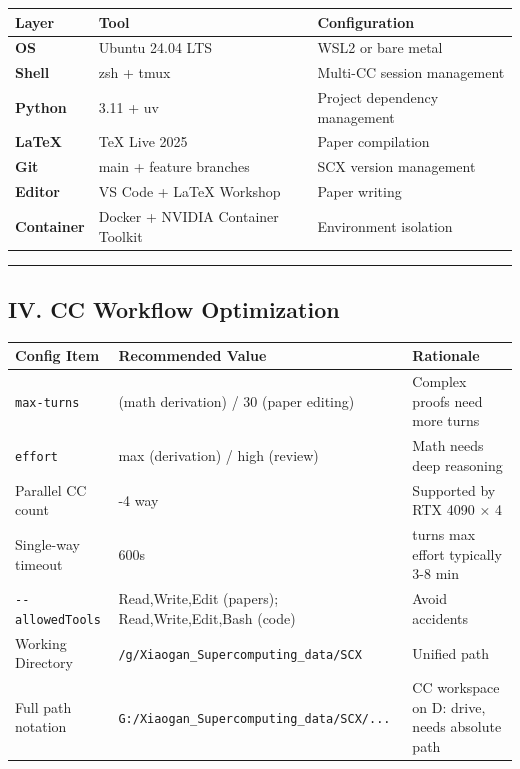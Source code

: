 \documentclass[
  12pt,
]{article}
\begin{document}
\begin{longtable}[]{@{}lll@{}}
\toprule\noalign{}
Layer & Tool & Configuration \\
\midrule\noalign{}
\endhead
\bottomrule\noalign{}
\endlastfoot
\textbf{OS} & Ubuntu 24.04 LTS & WSL2 or bare metal \\
\textbf{Shell} & zsh + tmux & Multi-CC session management \\
\textbf{Python} & 3.11 + uv & Project dependency management \\
\textbf{LaTeX} & TeX Live 2025 & Paper compilation \\
\textbf{Git} & main + feature branches & SCX version management \\
\textbf{Editor} & VS Code + LaTeX Workshop & Paper writing \\
\textbf{Container} & Docker + NVIDIA Container Toolkit & Environment isolation \\
\end{longtable}

\begin{center}\rule{0.5\linewidth}{0.5pt}\end{center}

\subsection{IV. CC Workflow Optimization}\label{iv-cc-workflow-optimization}

\begin{longtable}[]{@{}%
  >{\raggedright\arraybackslash}p{}%
  >{\raggedright\arraybackslash}p{}%
  >{\raggedright\arraybackslash}p{}@{}}
\toprule\noalign{}
\begin{minipage}[b]{\linewidth}\raggedright
Config Item
\end{minipage} & \begin{minipage}[b]{\linewidth}\raggedright
Recommended Value
\end{minipage} & \begin{minipage}[b]{\linewidth}\raggedright
Rationale
\end{minipage} \\
\midrule\noalign{}
\endhead
\bottomrule\noalign{}
\endlastfoot
\texttt{max-turns} & 50 (math derivation) / 30 (paper editing) & Complex proofs need more turns \\
\texttt{effort} & max (derivation) / high (review) & Math needs deep reasoning \\
Parallel CC count & 3-4 way & Supported by RTX 4090 × 4 \\
Single-way timeout & 600s & 50 turns max effort typically 3-8 min \\
\texttt{-\/-allowedTools} & Read,Write,Edit (papers); Read,Write,Edit,Bash (code) & Avoid accidents \\
Working Directory & \texttt{/g/Xiaogan\_Supercomputing\_data/SCX} & Unified path \\
Full path notation & \texttt{G:/Xiaogan\_Supercomputing\_data/SCX/...} & CC workspace on D: drive, needs absolute path \\
\end{longtable}
\end{document}
